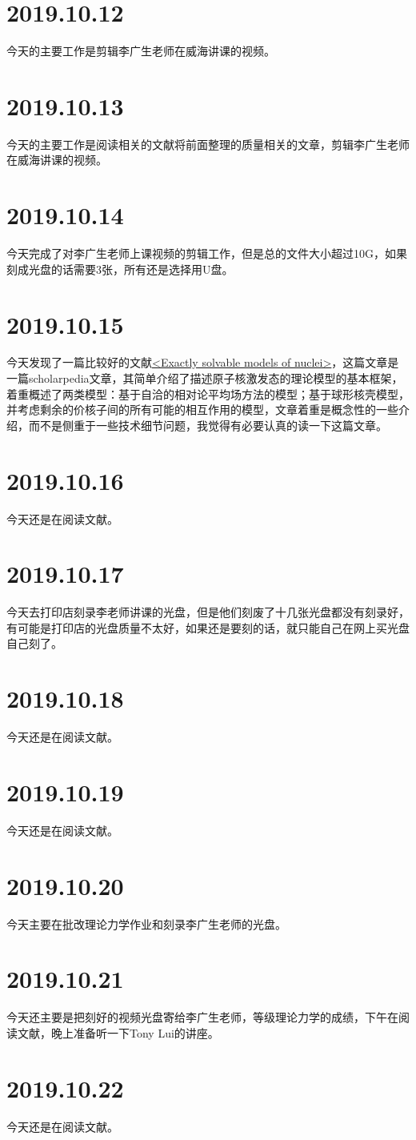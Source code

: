 \section{2019.10.12}
今天的主要工作是剪辑李广生老师在威海讲课的视频。

\section{2019.10.13}
今天的主要工作是阅读相关的文献将前面整理的质量相关的文章，剪辑李广生老师在威海讲课的视频。

\section{2019.10.14}
今天完成了对李广生老师上课视频的剪辑工作，但是总的文件大小超过10G，如果刻成光盘的话需要3张，所有还是选择用U盘。

\section{2019.10.15}
今天发现了一篇比较好的文献\href{https://www.doi.org/10.4249/scholarpedia.31279}{<Exactly solvable models of nuclei>}\cite{RN1176}，这篇文章是一篇scholarpedia文章，其简单介绍了描述原子核激发态的理论模型的基本框架，着重概述了两类模型：基于自洽的相对论平均场方法的模型；基于球形核壳模型，并考虑剩余的价核子间的所有可能的相互作用的模型，文章着重是概念性的一些介绍，而不是侧重于一些技术细节问题，我觉得有必要认真的读一下这篇文章。

\section{2019.10.16}
今天还是在阅读文献\cite{RN1176}。

\section{2019.10.17}
今天去打印店刻录李老师讲课的光盘，但是他们刻废了十几张光盘都没有刻录好，有可能是打印店的光盘质量不太好，如果还是要刻的话，就只能自己在网上买光盘自己刻了。

\section{2019.10.18}
今天还是在阅读文献\cite{RN1176}。

\section{2019.10.19}
今天还是在阅读文献\cite{RN1176}。

\section{2019.10.20}
今天主要在批改理论力学作业和刻录李广生老师的光盘。

\section{2019.10.21}
今天还主要是把刻好的视频光盘寄给李广生老师，等级理论力学的成绩，下午在阅读文献\cite{RN1176}，晚上准备听一下Tony Lui的讲座。

\section{2019.10.22}
今天还是在阅读文献\cite{RN1176}。
